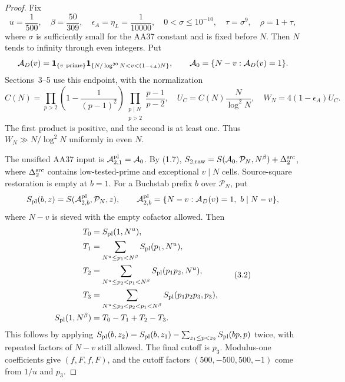 \begin{proof}
Fix
\[
 u=\frac1{500},\quad \beta=\frac{50}{309},\quad
 \epsilon_A=\eta_L=\frac1{10000},\quad
 0<\sigma\le10^{-10},\quad \tau=\sigma^9,\quad \rho=1+\tau,
\]
where $\sigma$ is sufficiently small for the AA37 constant and is fixed before $N$.
Then $N$ tends to infinity through even integers. Put
\[
 \mathcal A_D(v)=\mathbf1_{\{v\ {\rm prime}\}}
 \mathbf1_{\{N/\log^{30}N<v<(1-\epsilon_A)N\}},
 \qquad \mathcal A_0=\{N-v:\mathcal A_D(v)=1\}.
\]
Sections~3--5 use this endpoint, with the normalization
\[
 C(N)=\prod_{p>2}\left(1-\frac1{(p-1)^2}\right)
       \prod_{\substack{p\mid N\\p>2}}\frac{p-1}{p-2},\quad
 U_C=C(N)\frac{N}{\log^2N},\quad W_N=4(1-\epsilon_A)U_C.
 \tag{3.1}\label{p2:eq:s2-normalization}
\]
The first product is positive, and the second is at least one.
Thus $W_N\gg N/\log^2N$ uniformly in even $N$.

The unsifted AA37 input is $\mathcal A^{\rm pl}_{2,1}=\mathcal A_0$.
By (1.7),
$S_{2,\rm raw}=S(\mathcal A_0,\mathcal P_N,N^\beta)+\Delta^{\rm src}_2$,
where $\Delta^{\rm src}_2$ contains low-tested-prime and exceptional $v\mid N$ cells.
Source-square restoration is empty at $b=1$.
For a Buchstab prefix $b$ over $\mathcal P_N$, put
\[
 S_{\rm pl}(b,z)=S(\mathcal A^{\rm pl}_{2,b},\mathcal P_N,z),
 \qquad \mathcal A^{\rm pl}_{2,b}=\{N-v:\mathcal A_D(v)=1,\ b\mid N-v\},
\]
where $N-v$ is sieved with the empty cofactor allowed. Then
\[
\begin{split}
 T_0&=S_{\rm pl}(1,N^u),\\
 T_1&=\sum_{N^u\le p_1<N^\beta}S_{\rm pl}(p_1,N^u),\\
 T_2&=\sum_{N^u\le p_2<p_1<N^\beta}S_{\rm pl}(p_1p_2,N^u),\\
 T_3&=\sum_{N^u\le p_3<p_2<p_1<N^\beta}S_{\rm pl}(p_1p_2p_3,p_3),\\
 S_{\rm pl}(1,N^\beta)&=T_0-T_1+T_2-T_3.
\end{split}\tag{3.2}
\]
This follows by applying $S_{\rm pl}(b,z_2)=S_{\rm pl}(b,z_1)-\sum_{z_1\le p<z_2}S_{\rm pl}(bp,p)$ twice,
with repeated factors of $N-v$ still allowed.
The final cutoff is $p_3$.
Modulus-one coefficients give $(f,F,f,F)$, and the cutoff factors $(500,-500,500,-1)$
come from $1/u$ and $p_3$.


\end{proof}
